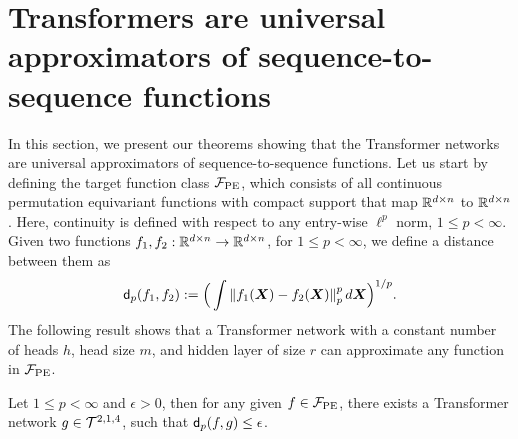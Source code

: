 \vspace*{-5pt}
\section{Transformers are universal approximators of sequence-to-sequence functions}
\vspace*{-4pt}
\label{sec:main}


In this section, we present our theorems showing that the Transformer networks are universal approximators of sequence-to-sequence functions. Let us start by defining the target function class $\mathcal{F}_{\rm PE}$, which consists of all continuous permutation equivariant functions with compact support that map $\mathbb{R}^{d \times n}$ to $\mathbb{R}^{d \times n}$. Here, continuity is defined with respect to any entry-wise $\ell^p$ norm, $1 \leq p < \infty$. Given two functions $f_1, f_2 : \mathbb{R}^{d\times n} \to \mathbb{R}^{d \times n}$, for $1 \leq p < \infty$, we define a distance between them as
$$
\mathsf{d}_p(f_1,f_2) := \Big (\int \left\|{f_1({\bm{X}}) - f_2({\bm{X}})}\right\|_p^p d{\bm{X}} \Big )^{1/p}.
$$
The following result shows that a Transformer network with a constant number of heads $h$, head size $m$, and hidden layer of size $r$ can approximate any function in $\mathcal{F}_{\rm PE}$.

\begin{theorem}
\label{thm:univapprox}
Let $1 \leq p < \infty$ and $\epsilon > 0$, then for any given $f \in \mathcal{F}_{\rm PE}$, there exists a Transformer network $g \in \mathcal{T}^{2,1,4}$, such that $\mathsf{d}_p(f,g) \leq \epsilon$. 
\end{theorem}


